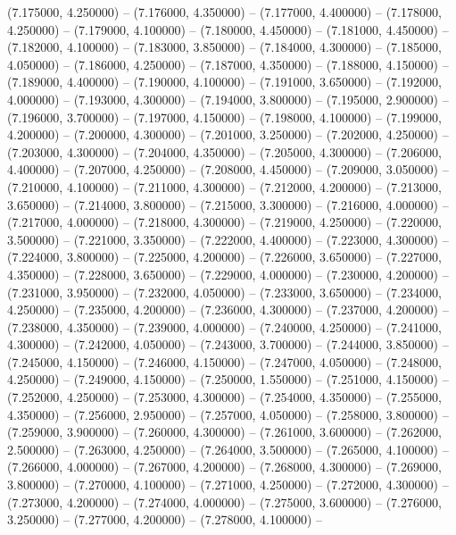 (7.175000, 4.250000) -- 
(7.176000, 4.350000) -- 
(7.177000, 4.400000) -- 
(7.178000, 4.250000) -- 
(7.179000, 4.100000) -- 
(7.180000, 4.450000) -- 
(7.181000, 4.450000) -- 
(7.182000, 4.100000) -- 
(7.183000, 3.850000) -- 
(7.184000, 4.300000) -- 
(7.185000, 4.050000) -- 
(7.186000, 4.250000) -- 
(7.187000, 4.350000) -- 
(7.188000, 4.150000) -- 
(7.189000, 4.400000) -- 
(7.190000, 4.100000) -- 
(7.191000, 3.650000) -- 
(7.192000, 4.000000) -- 
(7.193000, 4.300000) -- 
(7.194000, 3.800000) -- 
(7.195000, 2.900000) -- 
(7.196000, 3.700000) -- 
(7.197000, 4.150000) -- 
(7.198000, 4.100000) -- 
(7.199000, 4.200000) -- 
(7.200000, 4.300000) -- 
(7.201000, 3.250000) -- 
(7.202000, 4.250000) -- 
(7.203000, 4.300000) -- 
(7.204000, 4.350000) -- 
(7.205000, 4.300000) -- 
(7.206000, 4.400000) -- 
(7.207000, 4.250000) -- 
(7.208000, 4.450000) -- 
(7.209000, 3.050000) -- 
(7.210000, 4.100000) -- 
(7.211000, 4.300000) -- 
(7.212000, 4.200000) -- 
(7.213000, 3.650000) -- 
(7.214000, 3.800000) -- 
(7.215000, 3.300000) -- 
(7.216000, 4.000000) -- 
(7.217000, 4.000000) -- 
(7.218000, 4.300000) -- 
(7.219000, 4.250000) -- 
(7.220000, 3.500000) -- 
(7.221000, 3.350000) -- 
(7.222000, 4.400000) -- 
(7.223000, 4.300000) -- 
(7.224000, 3.800000) -- 
(7.225000, 4.200000) -- 
(7.226000, 3.650000) -- 
(7.227000, 4.350000) -- 
(7.228000, 3.650000) -- 
(7.229000, 4.000000) -- 
(7.230000, 4.200000) -- 
(7.231000, 3.950000) -- 
(7.232000, 4.050000) -- 
(7.233000, 3.650000) -- 
(7.234000, 4.250000) -- 
(7.235000, 4.200000) -- 
(7.236000, 4.300000) -- 
(7.237000, 4.200000) -- 
(7.238000, 4.350000) -- 
(7.239000, 4.000000) -- 
(7.240000, 4.250000) -- 
(7.241000, 4.300000) -- 
(7.242000, 4.050000) -- 
(7.243000, 3.700000) -- 
(7.244000, 3.850000) -- 
(7.245000, 4.150000) -- 
(7.246000, 4.150000) -- 
(7.247000, 4.050000) -- 
(7.248000, 4.250000) -- 
(7.249000, 4.150000) -- 
(7.250000, 1.550000) -- 
(7.251000, 4.150000) -- 
(7.252000, 4.250000) -- 
(7.253000, 4.300000) -- 
(7.254000, 4.350000) -- 
(7.255000, 4.350000) -- 
(7.256000, 2.950000) -- 
(7.257000, 4.050000) -- 
(7.258000, 3.800000) -- 
(7.259000, 3.900000) -- 
(7.260000, 4.300000) -- 
(7.261000, 3.600000) -- 
(7.262000, 2.500000) -- 
(7.263000, 4.250000) -- 
(7.264000, 3.500000) -- 
(7.265000, 4.100000) -- 
(7.266000, 4.000000) -- 
(7.267000, 4.200000) -- 
(7.268000, 4.300000) -- 
(7.269000, 3.800000) -- 
(7.270000, 4.100000) -- 
(7.271000, 4.250000) -- 
(7.272000, 4.300000) -- 
(7.273000, 4.200000) -- 
(7.274000, 4.000000) -- 
(7.275000, 3.600000) -- 
(7.276000, 3.250000) -- 
(7.277000, 4.200000) -- 
(7.278000, 4.100000) -- 
